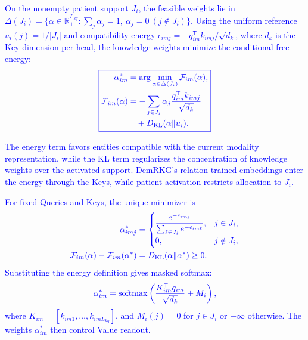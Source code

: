 \documentclass[lettersize,journal]{IEEEtran}
\begin{document}
    \textcolor{blue}{On the nonempty patient support $J_i$, the feasible weights lie in $\Delta(J_i)=\{\alpha\in\mathbb R_+^{L_{kg}}:\sum_j\alpha_j=1,\ \alpha_j=0\ (j\notin J_i)\}$. Using the uniform reference $u_i(j)=1/|J_i|$ and compatibility energy $\epsilon_{imj}=-q_{im}^{\mathsf T}k_{imj}/\sqrt{d_k}$, where $d_k$ is the Key dimension per head, the knowledge weights minimize the conditional free energy:}
    \begin{equation}
        {\color{blue}
        \boxed{
        \begin{aligned}
        \alpha_{im}^{*}&=\arg\min_{\alpha\in\Delta(J_i)}\mathcal F_{im}(\alpha),\\
        \mathcal F_{im}(\alpha)&=-\sum_{j\in J_i}\alpha_j
        \frac{q_{im}^{\mathsf T}k_{imj}}{\sqrt{d_k}}\\
        &\quad+D_{\mathrm{KL}}(\alpha\Vert u_i).
        \end{aligned}
        }
        }
        \label{eq:energy_min}
    \end{equation}

    \textcolor{blue}{The energy term favors entities compatible with the current modality representation, while the KL term regularizes the concentration of knowledge weights over the activated support. DemRKG's relation-trained embeddings enter the energy through the Keys, while patient activation restricts allocation to $J_i$.}

    \textcolor{blue}{For fixed Queries and Keys, the unique minimizer is}
    \begin{equation}
        {\color{blue}
        \begin{aligned}
        \alpha_{imj}^{*}&=
        \begin{cases}
        \displaystyle\frac{e^{-\epsilon_{imj}}}
        {\sum_{\ell\in J_i}e^{-\epsilon_{im\ell}}},&j\in J_i,\\[6pt]
        0,&j\notin J_i,
        \end{cases}\\
        \mathcal F_{im}(\alpha)-\mathcal F_{im}(\alpha^*)
        &=D_{\mathrm{KL}}(\alpha\Vert\alpha^*)\geq0.
        \end{aligned}
        }
        \label{eq:knowledge_optimum}
    \end{equation}
    \textcolor{blue}{Substituting the energy definition gives masked softmax:}
    \begin{equation}
        {\color{blue}
        \alpha_{im}^*=\operatorname{softmax}
        \left(\frac{K_{im}^{\mathsf T}q_{im}}{\sqrt{d_k}}+M_i\right),
        }
        \label{eq:knowledge_weights}
    \end{equation}
    \textcolor{blue}{where $K_{im}=[k_{im1},\ldots,k_{imL_{kg}}]$, and $M_i(j)=0$ for $j\in J_i$ or $-\infty$ otherwise. The weights $\alpha_{im}^*$ then control Value readout.}
\end{document}
